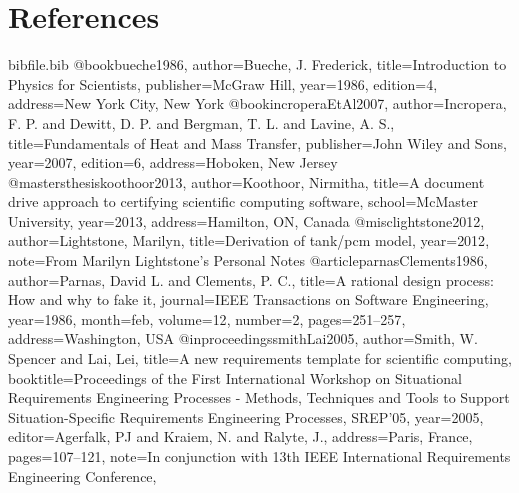 \documentclass[12pt]{article}
\begin{document}
\section{References}
\label{Sec:References}
\begin{filecontents*}{bibfile.bib}
@book{bueche1986,
author={Bueche, J. Frederick},
title={Introduction to Physics for Scientists},
publisher={McGraw Hill},
year={1986},
edition={4},
address={New York City, New York}}
@book{incroperaEtAl2007,
author={Incropera, F. P. and Dewitt, D. P. and Bergman, T. L. and Lavine, A. S.},
title={Fundamentals of Heat and Mass Transfer},
publisher={John Wiley and Sons},
year={2007},
edition={6},
address={Hoboken, New Jersey}}
@mastersthesis{koothoor2013,
author={Koothoor, Nirmitha},
title={A document drive approach to certifying scientific computing software},
school={McMaster University},
year={2013},
address={Hamilton, ON, Canada}}
@misc{lightstone2012,
author={Lightstone, Marilyn},
title={Derivation of tank/pcm model},
year={2012},
note={From Marilyn Lightstone's Personal Notes}}
@article{parnasClements1986,
author={Parnas, David L. and Clements, P. C.},
title={A rational design process: How and why to fake it},
journal={IEEE Transactions on Software Engineering},
year={1986},
month=feb,
volume={12},
number={2},
pages={251--257},
address={Washington, USA}}
@inproceedings{smithLai2005,
author={Smith, W. Spencer and Lai, Lei},
title={A new requirements template for scientific computing},
booktitle={Proceedings of the First International Workshop on Situational Requirements Engineering Processes - Methods, Techniques and Tools to Support Situation-Specific Requirements Engineering Processes, SREP'05},
year={2005},
editor={Agerfalk, PJ and Kraiem, N. and Ralyte, J.},
address={Paris, France},
pages={107--121},
note={In conjunction with 13th IEEE International Requirements Engineering Conference,}}
\end{filecontents*}
\nocite{*}
\printbibliography[heading=none]
\end{document}
